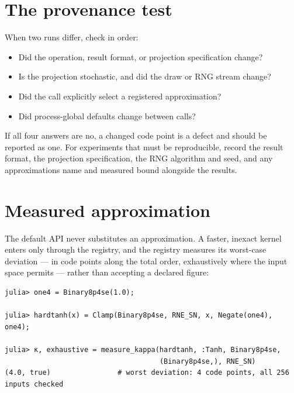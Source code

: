 \section{The provenance test}



\label{17718339924439357099}{}


When two runs differ, check in order:



\begin{itemize}
\item[1. ] Did the operation, result format, or projection specification change?


\item[2. ] Is the projection stochastic, and did the draw or RNG stream change?


\item[3. ] Did the call explicitly select a registered approximation?


\item[4. ] Did process-global defaults change between calls?

\end{itemize}


If all four answers are no, a changed code point is a defect and should be reported as one. For experiments that must be reproducible, record the result format, the projection specification, the RNG algorithm and seed, and any approximation{\textquotesingle}s name and measured bound alongside the results.



\section{Measured approximation}



\label{2780525639147152128}{}


The default API never substitutes an approximation. A faster, inexact kernel enters only through the registry, and the registry measures its worst-case deviation — in code points along the total order, exhaustively where the input space permits — rather than accepting a declared figure:




\nopagebreak[4]
\begin{verbatim}
julia> one4 = Binary8p4se(1.0);

julia> hardtanh(x) = Clamp(Binary8p4se, RNE_SN, x, Negate(one4), one4);

julia> κ, exhaustive = measure_kappa(hardtanh, :Tanh, Binary8p4se,
                                     (Binary8p4se,), RNE_SN)
(4.0, true)                # worst deviation: 4 code points, all 256 inputs checked
\end{verbatim}



